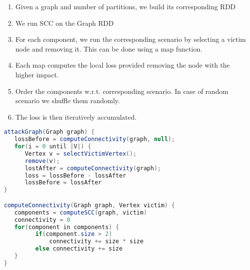 \begin{enumerate}
\item Given a graph and number of partitions, we build its corresponding RDD
\item We run SCC on the Graph RDD
\item For each component, we run the corresponding scenario by selecting a victim node and removing it. This can be done using a map function.
\item Each map computes the local loss provided removing the node with the higher impact.
\item Order the components w.r.t. corresponding scenario. In case of random scenario we shuffle them randomly. 
\item The loss is then iteratively accumulated.
\end{enumerate}

\begin{lstlisting}[language=java]
attackGraph(Graph graph) {
   lossBefore = computeConnectivity(graph, null);
   for(i = 0 until |V|) {
      Vertex v = selectVictimVertex();
      remove(v);
      lostAfter = computeConnectivity(graph);
      loss = lossBefore - lossAfter
      lossBefore = lossAfter
}

computeConnectivity(Graph graph, Vertex victim) {
   components = computeSCC(graph, victim)
   connectivity = 0
   for(component in components) {
         if(component.size > 2) 
             connectivity += size * size
         else connectivity += size
   }
}
\end{lstlisting} 




